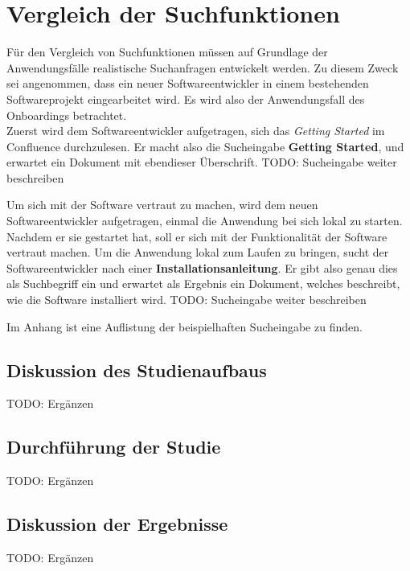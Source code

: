\chapter{Vergleich der Suchfunktionen}
Für den Vergleich von Suchfunktionen müssen auf Grundlage der Anwendungsfälle realistische Suchanfragen entwickelt werden.
Zu diesem Zweck sei angenommen, dass ein neuer Softwareentwickler in einem bestehenden Softwareprojekt eingearbeitet wird.
Es wird also der Anwendungsfall des Onboardings betrachtet.\\

Zuerst wird dem Softwareentwickler aufgetragen, sich das \textit{Getting Started} im Confluence durchzulesen.
Er macht also die Sucheingabe \textbf{Getting Started}, und erwartet ein Dokument mit ebendieser Überschrift. 
TODO: Sucheingabe weiter beschreiben

Um sich mit der Software vertraut zu machen, wird dem neuen Softwareentwickler aufgetragen, einmal die Anwendung bei sich lokal zu starten.
Nachdem er sie gestartet hat, soll er sich mit der Funktionalität der Software vertraut machen.
Um die Anwendung lokal zum Laufen zu bringen, sucht der Softwareentwickler nach einer \textbf{Installationsanleitung}.
Er gibt also genau dies als Suchbegriff ein und erwartet als Ergebnis ein Dokument, welches beschreibt, wie die Software installiert wird.
TODO: Sucheingabe weiter beschreiben

Im Anhang ist eine Auflistung der beispielhaften Sucheingabe zu finden.

\section{Diskussion des Studienaufbaus}
TODO: Ergänzen

\section{Durchführung der Studie}
TODO: Ergänzen

\section{Diskussion der Ergebnisse}
TODO: Ergänzen
